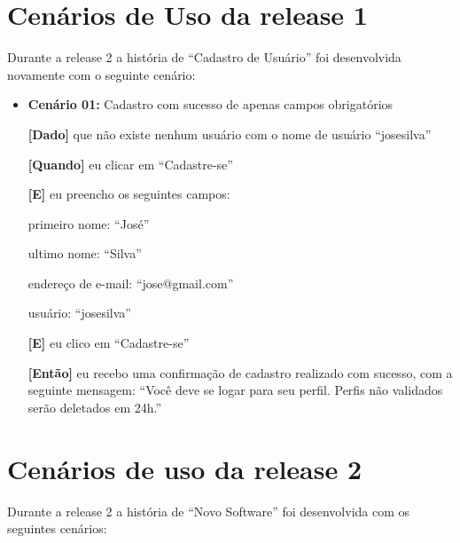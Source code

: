 \section{Cenários de Uso da release 1}
\label{cenario_r1}


Durante a release 2 a história de ``Cadastro de Usuário'' foi desenvolvida novamente com o seguinte cenário:

\begin{itemize}
\item\textbf{Cenário 01:} Cadastro com sucesso de apenas campos obrigatórios

    \textbf{[Dado]} que não existe nenhum usuário com o nome de usuário ``josesilva''

    \textbf{[Quando]} eu clicar em ``Cadastre-se''

    \textbf{[E]} eu preencho os seguintes campos: 

        \subitem primeiro nome: ``José''

        \subitem ultimo nome: ``Silva''

        \subitem endereço de e-mail: ``jose@gmail.com''

        \subitem usuário: ``josesilva''
        
    \textbf{[E]} eu clico em ``Cadastre-se''

    \textbf{[Então]} eu recebo uma confirmação de cadastro realizado com sucesso, com a seguinte mensagem: 
    ``Você deve se logar para seu perfil. Perfis não validados serão deletados em 24h.''
\end{itemize}

\section{Cenários de uso da release 2}
\label{cenario_r2}

Durante a release 2 a história de ``Novo Software'' foi desenvolvida com os seguintes cenários:

